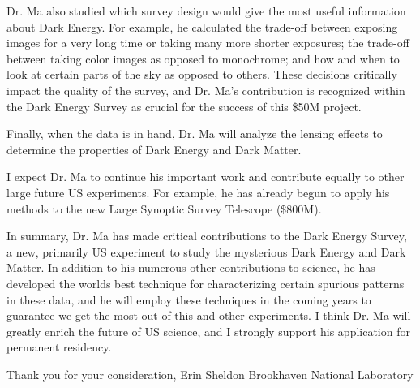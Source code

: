 \documentclass[12pt]{letter}
\begin{document}
Dr. Ma also studied which survey design would give the most useful information
about Dark Energy.  For example, he calculated the trade-off between exposing
images for a very long time or taking many more shorter exposures; the
trade-off between taking color images as opposed to monochrome; and how and
when to look at certain parts of the sky as opposed to others.  These decisions
critically impact the quality of the survey, and Dr. Ma's contribution is
recognized within the Dark Energy Survey as crucial for the success of this
\$50M project.

Finally, when the data is in hand, Dr. Ma will analyze the lensing effects
to determine the properties of Dark Energy and Dark Matter.

I expect Dr. Ma to continue his important work and contribute equally to other
large future US experiments.  For example, he has already begun to apply his
methods to the new Large Synoptic Survey Telescope (\$800M). 

In summary, Dr. Ma has made critical contributions to the Dark Energy Survey, a
new, primarily US experiment to study the mysterious Dark Energy and Dark
Matter.  In addition to his numerous other contributions to science, he has
developed the worlds best technique for characterizing certain spurious
patterns in these data, and he will employ these techniques in the coming years
to guarantee we get the most out of this and other experiments.     I think Dr.
Ma will greatly enrich the future of US science, and I strongly support his
application for permanent residency. 

{\noindent Thank you for your consideration,}
\newline
\newline
{\noindent Erin Sheldon}
\newline
{\noindent Brookhaven National Laboratory}
\end{document}
